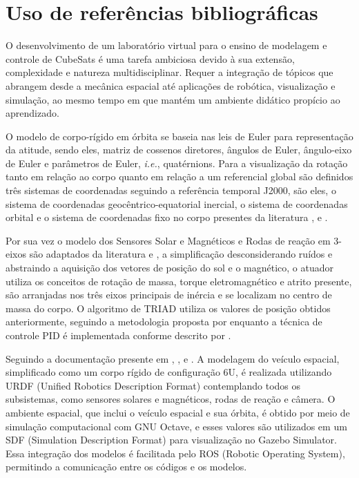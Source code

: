 
\chapter{Uso de referências bibliográficas}
O desenvolvimento de um laboratório virtual para o ensino de modelagem e controle de CubeSats é uma tarefa ambiciosa devido à sua extensão, complexidade e natureza multidisciplinar. Requer a integração de tópicos que abrangem desde a mecânica espacial até aplicações de robótica, visualização e simulação, ao mesmo tempo em que mantém um ambiente didático propício ao aprendizado.

O modelo de corpo-rígido em órbita se baseia nas leis de Euler para representação da atitude, sendo eles, matriz de cossenos diretores, ângulos de Euler, ângulo-eixo de Euler e parâmetros de Euler, \textit{i.e.}, quatérnions. Para a visualização da rotação tanto em relação ao corpo quanto em relação a um referencial global são definidos três sistemas de coordenadas seguindo a referência temporal J2000, são eles, o sistema de coordenadas geocêntrico-equatorial inercial, o sistema de coordenadas orbital e o sistema de coordenadas fixo no corpo presentes da literatura ,  e . 

Por sua vez o modelo dos Sensores Solar e Magnéticos e Rodas de reação em 3-eixos são adaptados da literatura  e \cite{baroni2020attitude},  a simplificação desconsiderando ruídos e abstraindo a aquisição dos vetores de posição do sol e o magnético, o atuador utiliza os conceitos de rotação de massa, torque eletromagnético e atrito presente, são arranjadas nos três eixos principais de inércia e se localizam no centro de massa do corpo. O algoritmo de TRIAD utiliza os valores de posição obtidos anteriormente, seguindo a metodologia proposta por  enquanto a técnica de controle PID é implementada conforme descrito por .

Seguindo a documentação presente em , ,  e . A modelagem do veículo espacial, simplificado como um corpo rígido de configuração 6U, é realizada utilizando URDF (Unified Robotics Description Format) contemplando todos os subsistemas, como sensores solares e magnéticos, rodas de reação e câmera. O ambiente espacial, que inclui o veículo espacial e sua órbita, é obtido por meio de simulação computacional com GNU Octave, e esses valores são utilizados em um SDF (Simulation Description Format) para visualização no Gazebo Simulator. Essa integração dos modelos é facilitada pelo ROS (Robotic Operating System), permitindo a comunicação entre os códigos e os modelos. 



